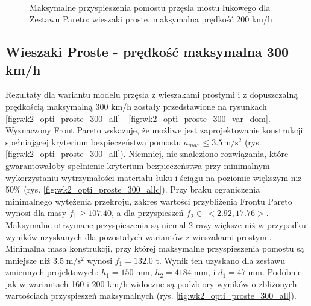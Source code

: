 \begin{figure}[hbt!]
	\centering
	\\
	\captionsetup{justification=centering}
	\caption{Maksymalne przyspieszenia pomostu przęsła mostu łukowego dla Zestawu Pareto: wieszaki proste, maksymalna prędkość 200 km/h}
	\label{fig:wk2_opti_proste_200_var_dom}
\end{figure}







\pagebreak[4]
\subsection{Wieszaki Proste - prędkość maksymalna 300 km/h}

Rezultaty dla wariantu modelu przęsła z wieszakami prostymi i z dopuszczalną prędkością maksymalną 300 km/h zostały przedstawione na rysunkach \ref{fig:wk2_opti_proste_300_all} - \ref{fig:wk2_opti_proste_300_var_dom}. Wyznaczony Front Pareto wskazuje, że możliwe jest zaprojektowanie konstrukcji spełniającej kryterium bezpieczeństwa pomostu $a_{max}\le 3.5\,\mathrm{m/s^2}$ (rys. \ref{fig:wk2_opti_proste_300_all}). Niemniej, nie znaleziono rozwiązania, które gwarantowałoby spełnienie kryterium bezpieczeństwa przy minimalnym wykorzystaniu wytrzymałości materiału łuku i ściągu na poziomie większym niż 50\% (rys. \ref{fig:wk2_opti_proste_300_allc}). Przy braku ograniczenia minimalnego wytężenia przekroju, zakres wartości przybliżenia Frontu Pareto wynosi dla masy $f_1 \ge 107.40$, a dla przyspieszeń $f_2 \in\,<2.92,17.76>$. Maksymalne otrzymane przyspieszenia są niemal 2 razy większe niż w przypadku wyników uzyskanych dla pozostałych wariantów z wieszakami prostymi. Minimalna masa konstrukcji, przy której maksymalne przyspieszenia pomostu są mniejsze niż $3.5\;\mathrm{m/s^2}$ wynosi $f_1 = 132.0$ t. Wynik ten uzyskano dla zestawu zmiennych projektowych: $h_1 = 150\;\mathrm{mm}$, $h_2 = 4184\;\mathrm{mm}$, i $d_1 = 47\;\mathrm{mm}$. Podobnie jak w wariantach 160 i 200 km/h widoczne są podzbiory wyników o zbliżonych wartościach przyspieszeń maksymalnych (rys. \ref{fig:wk2_opti_proste_300_all}). 

